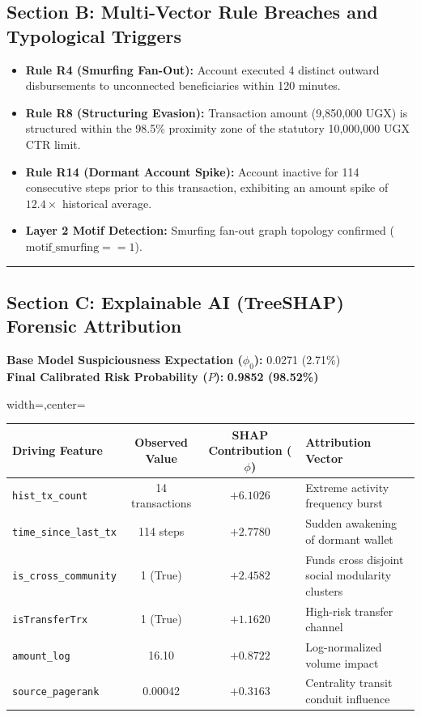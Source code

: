 \begin{tcolorbox}[colback=gray!5,colframe=black!70,title=\textbf{FINANCIAL INTELLIGENCE AUTHORITY (UGANDA) --- SUSPICIOUS ACTIVITY REPORT (SAR)}]
\subsection*{Section B: Multi-Vector Rule Breaches and Typological Triggers}
\begin{itemize}
    \item \textbf{Rule R4 (Smurfing Fan-Out):} Account executed 4 distinct outward disbursements to unconnected beneficiaries within 120 minutes.
    \item \textbf{Rule R8 (Structuring Evasion):} Transaction amount (9,850,000 UGX) is structured within the 98.5\% proximity zone of the statutory 10,000,000 UGX CTR limit.
    \item \textbf{Rule R14 (Dormant Account Spike):} Account inactive for 114 consecutive steps prior to this transaction, exhibiting an amount spike of $12.4\times$ historical average.
    \item \textbf{Layer 2 Motif Detection:} Smurfing fan-out graph topology confirmed ($\text{motif\_smurfing} == 1$).
\end{itemize}

\vspace{0.8em}
\hrule
\vspace{0.8em}

\subsection*{Section C: Explainable AI (TreeSHAP) Forensic Attribution}
\textbf{Base Model Suspiciousness Expectation ($\phi_0$):} 0.0271 (2.71\%)\\
\textbf{Final Calibrated Risk Probability ($P$):} \textbf{0.9852 (98.52\%)}

\vspace{0.5em}
\begin{adjustbox}{width=\linewidth,center=\linewidth}
\begin{tabular}{|l|c|c|p{6.5cm}|}
\hline
\rowcolor{gray!20}
\textbf{Driving Feature} & \textbf{Observed Value} & \textbf{SHAP Contribution ($\phi$)} & \textbf{Attribution Vector} \\
\hline
\texttt{hist\_tx\_count} & 14 transactions & $+6.1026$ & Extreme activity frequency burst \\
\hline
\texttt{time\_since\_last\_tx} & 114 steps & $+2.7780$ & Sudden awakening of dormant wallet \\
\hline
\texttt{is\_cross\_community} & 1 (True) & $+2.4582$ & Funds cross disjoint social modularity clusters \\
\hline
\texttt{isTransferTrx} & 1 (True) & $+1.1620$ & High-risk transfer channel \\
\hline
\texttt{amount\_log} & 16.10 & $+0.8722$ & Log-normalized volume impact \\
\hline
\texttt{source\_pagerank} & 0.00042 & $+0.3163$ & Centrality transit conduit influence \\
\hline
\end{tabular}
\end{adjustbox}


\end{tcolorbox}
